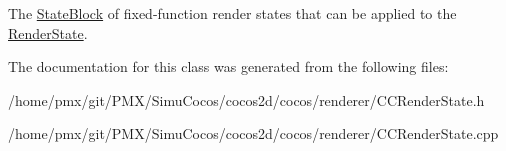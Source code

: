 The \hyperlink{classRenderState_1_1StateBlock}{State\+Block} of fixed-\/function render states that can be applied to the \hyperlink{classRenderState}{Render\+State}. 

The documentation for this class was generated from the following files\+:\begin{DoxyCompactItemize}
\item 
/home/pmx/git/\+P\+M\+X/\+Simu\+Cocos/cocos2d/cocos/renderer/C\+C\+Render\+State.\+h\item 
/home/pmx/git/\+P\+M\+X/\+Simu\+Cocos/cocos2d/cocos/renderer/C\+C\+Render\+State.\+cpp\end{DoxyCompactItemize}
